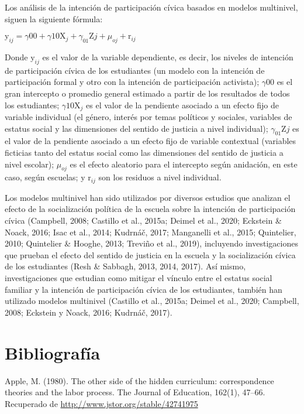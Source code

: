\documentclass[12pt,twoside]{templates/facsothesis}
\begin{document}
Los análisis de la intención de participación cívica basados en modelos multinivel, siguen la siguiente fórmula:

\(\text{y}_{ij}=\gamma{00}+\gamma{10}\text{X}_j+\gamma_{01}\text{Z}j+\mu_{oj}+\text{r}_{ij}\)

Donde \(\text{y}_{ij}\) es el valor de la variable dependiente, es decir, los niveles de intención de participación cívica de los estudiantes (un modelo con la intención de participación formal y otro con la intención de participación activista); \(\gamma{00}\) es el gran intercepto o promedio general estimado a partir de los resultados de todos los estudiantes; \(\gamma{10}\text{X}_j\) es el valor de la pendiente asociado a un efecto fijo de variable individual (el género, interés por temas políticos y sociales, variables de estatus social y las dimensiones del sentido de justicia a nivel individual); \(\gamma_{01}\text{Z}j\) es el valor de la pendiente asociado a un efecto fijo de variable contextual (variables ficticias tanto del estatus social como las dimensiones del sentido de justicia a nivel escolar); \(\mu_{oj}\) es el efecto aleatorio para el intercepto según anidación, en este caso, según escuelas; y \(\text{r}_{ij}\) son los residuos a nivel individual.

Los modelos multinivel han sido utilizados por diversos estudios que analizan el efecto de la socialización política de la escuela sobre la intención de participación cívica (Campbell, 2008; Castillo et al., 2015a; Deimel et al., 2020; Eckstein \& Noack, 2016; Isac et al., 2014; Kudrnáč, 2017; Manganelli et al., 2015; Quintelier, 2010; Quintelier \& Hooghe, 2013; Treviño et al., 2019), incluyendo investigaciones que prueban el efecto del sentido de justicia en la escuela y la socialización cívica de los estudiantes (Resh \& Sabbagh, 2013, 2014, 2017). Así mismo, investigaciones que estudian como mitigar el vínculo entre el estatus social familiar y la intención de participación cívica de los estudiantes, también han utilizado modelos multinivel (Castillo et al., 2015a; Deimel et al., 2020; Campbell, 2008; Eckstein y Noack, 2016; Kudrnáč, 2017).

\hypertarget{bibliografuxeda}{%
\chapter*{Bibliografía}\label{bibliografuxeda}}

Apple, M. (1980). The other side of the hidden curriculum: correspondence theories and the labor process. The Journal of Education, 162(1), 47--66. Recuperado de \url{http://www.jstor.org/stable/42741975}
\end{document}
